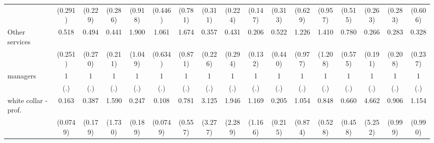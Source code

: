 {\begin{tabular}{l*{16}{c}}
                    &     (0.291)         &     (0.229)         &     (0.286)         &     (0.918)         &     (0.446)         &     (0.781)         &     (0.311)         &     (0.224)         &     (0.147)         &     (0.313)         &     (0.629)         &     (0.957)         &     (0.515)         &     (0.263)         &     (0.283)         &     (0.606)         \\
[1em]
Other services      &       0.518         &       0.494         &       0.441         &       1.900         &       1.061         &       1.674         &       0.357         &       0.431         &       0.206\sym{*}  &       0.522         &       1.226         &       1.410         &       0.780         &       0.266         &       0.283         &       0.328         \\
                    &     (0.251)         &     (0.270)         &     (0.211)         &     (1.049)         &     (0.634)         &     (0.871)         &     (0.226)         &     (0.294)         &     (0.132)         &     (0.440)         &     (0.977)         &     (1.208)         &     (0.575)         &     (0.191)         &     (0.208)         &     (0.237)         \\
[1em]
managers            &           1         &           1         &           1         &           1         &           1         &           1         &           1         &           1         &           1         &           1         &           1         &           1         &           1         &           1         &           1         &           1         \\
                    &         (.)         &         (.)         &         (.)         &         (.)         &         (.)         &         (.)         &         (.)         &         (.)         &         (.)         &         (.)         &         (.)         &         (.)         &         (.)         &         (.)         &         (.)         &         (.)         \\
[1em]
white collar - prof.&       0.163\sym{***}&       0.387\sym{*}  &       1.590         &       0.247         &       0.108\sym{**} &       0.781         &       3.125         &       1.946         &       1.169         &       0.205         &       1.054         &       0.848         &       0.660         &       4.662         &       0.906         &       1.154         \\
                    &    (0.0749)         &     (0.179)         &     (1.730)         &     (0.189)         &    (0.0749)         &     (0.557)         &     (3.277)         &     (2.289)         &     (1.166)         &     (0.215)         &     (0.874)         &     (0.528)         &     (0.458)         &     (5.252)         &     (0.999)         &     (0.990)         \\

\end{tabular}}
